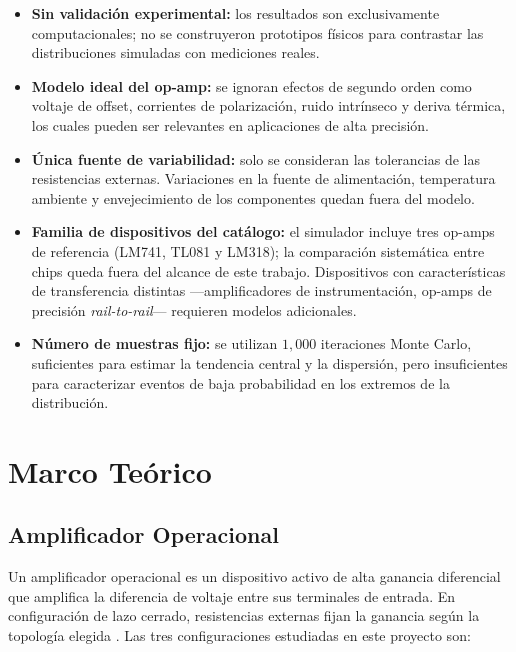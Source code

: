 ﻿\documentclass[12pt, letterpaper]{article}
\begin{document}
\begin{itemize}[leftmargin=2em]
    \item \textbf{Sin validación experimental:} los resultados son exclusivamente
          computacionales; no se construyeron prototipos físicos para contrastar
          las distribuciones simuladas con mediciones reales.
    \item \textbf{Modelo ideal del op-amp:} se ignoran efectos de segundo orden
          como voltaje de offset, corrientes de polarización, ruido intrínseco y
          deriva térmica, los cuales pueden ser relevantes en aplicaciones de
          alta precisión.
    \item \textbf{Única fuente de variabilidad:} solo se consideran las
          tolerancias de las resistencias externas. Variaciones en la fuente de
          alimentación, temperatura ambiente y envejecimiento de los componentes
          quedan fuera del modelo.
    \item \textbf{Familia de dispositivos del catálogo:} el simulador incluye
          tres op-amps de referencia (LM741, TL081 y LM318); la comparación
          sistemática entre chips queda fuera del alcance de este trabajo.
          Dispositivos con características de transferencia distintas
          —amplificadores de instrumentación, op-amps de precisión
          \textit{rail-to-rail}— requieren modelos adicionales.
    \item \textbf{Número de muestras fijo:} se utilizan \(1{,}000\) iteraciones
          Monte Carlo, suficientes para estimar la tendencia central y la
          dispersión, pero insuficientes para caracterizar eventos de baja
          probabilidad en los extremos de la distribución.
\end{itemize}

\newpage
\section{Marco Teórico}

\subsection{Amplificador Operacional}

Un amplificador operacional es un dispositivo activo de alta ganancia diferencial
que amplifica la diferencia de voltaje entre sus terminales de entrada. En
configuración de lazo cerrado, resistencias externas fijan la ganancia según la
topología elegida \cite{sedra2015}. Las tres configuraciones estudiadas en este proyecto son:
\end{document}
